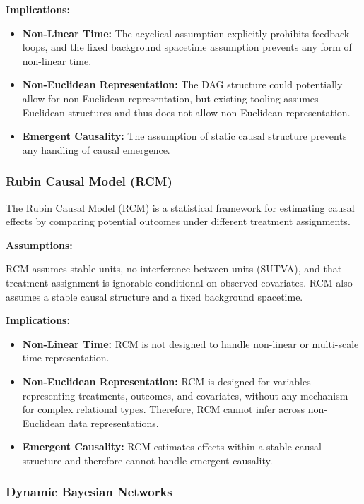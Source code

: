 \textbf{Implications:}

\begin{itemize}
    \item \textbf{Non-Linear Time:} The acyclical assumption explicitly prohibits feedback loops, and the fixed background spacetime assumption prevents any form of non-linear time.
    \item \textbf{Non-Euclidean Representation:} The DAG structure could potentially allow for non-Euclidean representation, but existing tooling assumes Euclidean structures and thus does not allow non-Euclidean representation.
    \item \textbf{Emergent Causality:} The assumption of static causal structure prevents any handling of causal emergence.
\end{itemize}


\subsubsection*{Rubin Causal Model (RCM)}

The Rubin Causal Model \cite{rubin2005causal} (RCM) is a statistical framework for estimating causal effects by comparing potential outcomes under different treatment assignments.

\textbf{Assumptions:}

RCM assumes stable units, no interference between units (SUTVA), and that treatment assignment is ignorable conditional on observed covariates. RCM also assumes a stable causal structure and a fixed background spacetime.

\textbf{Implications:}

\begin{itemize}
    \item \textbf{Non-Linear Time:} RCM is not designed to handle non-linear or multi-scale time representation.
    \item \textbf{Non-Euclidean Representation:} RCM is designed for variables representing treatments, outcomes, and covariates, without any mechanism for complex relational types. Therefore, RCM cannot infer across non-Euclidean data representations.
    \item \textbf{Emergent Causality:} RCM estimates effects within a stable causal structure and therefore cannot handle emergent causality.
\end{itemize}

\subsubsection*{Dynamic Bayesian Networks}

